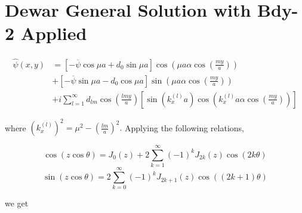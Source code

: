 \documentclass{article}
\begin{document}
\section{Dewar General Solution with Bdy-2 Applied}

\begin{equation}
\begin{split}
    \hat{\psi}(x,y) &= \left[-\overline{\psi}\cos{\mu a} + d_0\sin{\mu a} \right] \cos\left( \mu a \alpha \cos\left( \frac{my}{a} \right)  \right) \\
                    &+ \left[-\overline{\psi}\sin{\mu a} - d_0\cos{\mu a} \right] \sin\left( \mu a \alpha \cos\left( \frac{my}{a} \right)  \right) \\
                    &+i \sum_{l=1}^{\infty} d_{lm} \cos\left( \frac{lmy}{a} \right) \left[\sin\left( k_x^{(l)} a \right) \cos\left( k_x^{(l)}a \alpha \cos\left( \frac{my}{a} \right)  \right) \right]
\end{split}
\end{equation}

where $\left( k_x^{(l)} \right)^{2}=\mu^2 - \left( \frac{lm}{a} \right) ^2.$ Applying the following relations,

\begin{equation}
    \cos\left( z\cos\theta \right)=J_0\left( z \right) + 2 \sum_{k=1}^{\infty} (-1)^k J_{2k} \left( z \right) \cos\left( 2k\theta \right) 
\end{equation}
\begin{equation}
\sin\left(z\cos\theta\right)=2\sum_{k=0}^{\infty}(-1)^{k}J_{2k+1}\left(z\right)\cos\left((2k+1)\theta\right)
\end{equation} 

we get
\end{document}
